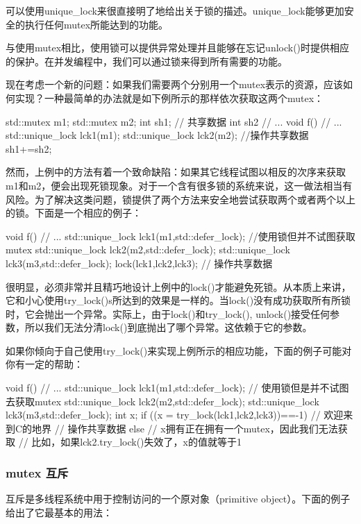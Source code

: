 可以使用unique_lock来很直接明了地给出关于锁的描述。unique_lock能够更加安全的执行任何mutex所能达到的功能。

与使用mutex相比，使用锁可以提供异常处理并且能够在忘记unlock()时提供相应的保护。在并发编程中，我们可以通过锁来得到所有需要的功能。

现在考虑一个新的问题：如果我们需要两个分别用一个mutex表示的资源，应该如何实现？一种最简单的办法就是如下例所示的那样依次获取这两个mutex：

\begin{Code}
	std::mutex m1;
	std::mutex m2;
	int sh1; // 共享数据
	int sh2
	// ...
	void f(){
		// ...
		std::unique_lock lck1(m1);
		std::unique_lock lck2(m2);
		//操作共享数据
		sh1+=sh2;
	}
\end{Code}

然而，上例中的方法有着一个致命缺陷：如果其它线程试图以相反的次序来获取m1和m2，便会出现死锁现象。对于一个含有很多锁的系统来说，这一做法相当有风险。为了解决这类问题，锁提供了两个方法来安全地尝试获取两个或者两个以上的锁。下面是一个相应的例子：

\begin{Code}
	void f(){
		// ...
		std::unique_lock lck1(m1,std::defer_lock); //使用锁但并不试图获取mutex
		std::unique_lock lck2(m2,std::defer_lock);
		std::unique_lock lck3(m3,std::defer_lock);
		lock(lck1,lck2,lck3);
		// 操作共享数据
	}
\end{Code}

很明显，必须非常并且精巧地设计上例中的lock()才能避免死锁。从本质上来讲，它和小心使用try_lock()s所达到的效果是一样的。当lock()没有成功获取所有所锁时，它会抛出一个异常。实际上，由于lock()和try_lock(), unlock()接受任何参数，所以我们无法分清lock()到底抛出了哪个异常。这依赖于它的参数。

如果你倾向于自己使用try_lock()来实现上例所示的相应功能，下面的例子可能对你有一定的帮助：

\begin{Code}
	void f(){
		// ...
		std::unique_lock lck1(m1,std::defer_lock); // 使用锁但是并不试图去获取mutex
		std::unique_lock lck2(m2,std::defer_lock);
		std::unique_lock lck3(m3,std::defer_lock);
		int x;
		if ((x = try_lock(lck1,lck2,lck3))==-1) { // 欢迎来到C的地界
			// 操作共享数据
		}
		else {
			// x拥有正在拥有一个mutex，因此我们无法获取
			// 比如，如果lck2.try_lock()失效了，x的值就等于1
		}
	}
\end{Code}

\subsubsection{mutex 互斥}
互斥是多线程系统中用于控制访问的一个原对象（primitive object）。下面的例子给出了它最基本的用法：

